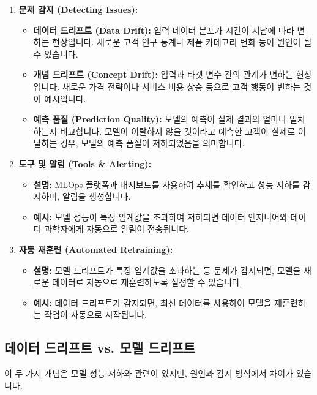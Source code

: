 \documentclass[11pt,a4paper]{article}
\begin{document}
\begin{enumerate}
    \item \textbf{문제 감지 (Detecting Issues):}
    \begin{itemize}
        \item \textbf{데이터 드리프트 (Data Drift):} 입력 데이터 분포가 시간이 지남에 따라 변하는 현상입니다. 새로운 고객 인구 통계나 제품 카테고리 변화 등이 원인이 될 수 있습니다.
        \item \textbf{개념 드리프트 (Concept Drift):} 입력과 타겟 변수 간의 관계가 변하는 현상입니다. 새로운 가격 전략이나 서비스 비용 상승 등으로 고객 행동이 변하는 것이 예시입니다.
        \item \textbf{예측 품질 (Prediction Quality):} 모델의 예측이 실제 결과와 얼마나 일치하는지 비교합니다. 모델이 이탈하지 않을 것이라고 예측한 고객이 실제로 이탈하는 경우, 모델의 예측 품질이 저하되었음을 의미합니다.
    \end{itemize}

    \item \textbf{도구 및 알림 (Tools \& Alerting):}
    \begin{itemize}
        \item \textbf{설명:} MLOps 플랫폼과 대시보드를 사용하여 추세를 확인하고 성능 저하를 감지하며, 알림을 생성합니다.
        \item \textbf{예시:} 모델 성능이 특정 임계값을 초과하여 저하되면 데이터 엔지니어와 데이터 과학자에게 자동으로 알림이 전송됩니다.
    \end{itemize}

    \item \textbf{자동 재훈련 (Automated Retraining):}
    \begin{itemize}
        \item \textbf{설명:} 모델 드리프트가 특정 임계값을 초과하는 등 문제가 감지되면, 모델을 새로운 데이터로 자동으로 재훈련하도록 설정할 수 있습니다.
        \item \textbf{예시:} 데이터 드리프트가 감지되면, 최신 데이터를 사용하여 모델을 재훈련하는 작업이 자동으로 시작됩니다.
    \end{itemize}
\end{enumerate}

\subsection{데이터 드리프트 vs. 모델 드리프트}

이 두 가지 개념은 모델 성능 저하와 관련이 있지만, 원인과 감지 방식에서 차이가 있습니다.
\end{document}

